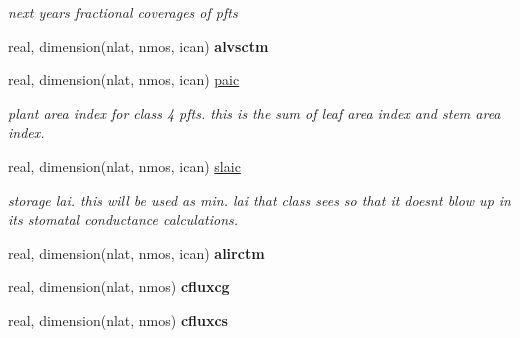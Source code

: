 \begin{DoxyCompactItemize}
\begin{DoxyCompactList}\small\item\em next year\textquotesingle{}s fractional coverages of pfts \end{DoxyCompactList}\item 
\hypertarget{structctem__statevars_1_1veg__rot_a3620434a43dd413dadbc2df0ab4c1a0c}{}real, dimension(nlat, nmos, ican) {\bfseries alvsctm}\label{structctem__statevars_1_1veg__rot_a3620434a43dd413dadbc2df0ab4c1a0c}

\item 
\hypertarget{structctem__statevars_1_1veg__rot_ab8144fc5348967ab33132c88b7235069}{}real, dimension(nlat, nmos, ican) \hyperlink{structctem__statevars_1_1veg__rot_ab8144fc5348967ab33132c88b7235069}{paic}\label{structctem__statevars_1_1veg__rot_ab8144fc5348967ab33132c88b7235069}

\begin{DoxyCompactList}\small\item\em plant area index for class\textquotesingle{} 4 pfts. this is the sum of leaf area index and stem area index. \end{DoxyCompactList}\item 
\hypertarget{structctem__statevars_1_1veg__rot_a2d77c552f815b9a3794df8cd396cba03}{}real, dimension(nlat, nmos, ican) \hyperlink{structctem__statevars_1_1veg__rot_a2d77c552f815b9a3794df8cd396cba03}{slaic}\label{structctem__statevars_1_1veg__rot_a2d77c552f815b9a3794df8cd396cba03}

\begin{DoxyCompactList}\small\item\em storage lai. this will be used as min. lai that class sees so that it doesn\textquotesingle{}t blow up in its stomatal conductance calculations. \end{DoxyCompactList}\item 
\hypertarget{structctem__statevars_1_1veg__rot_a646c8951d904a9c16dae50515625fdc1}{}real, dimension(nlat, nmos, ican) {\bfseries alirctm}\label{structctem__statevars_1_1veg__rot_a646c8951d904a9c16dae50515625fdc1}

\item 
\hypertarget{structctem__statevars_1_1veg__rot_a4c01f2ab1fdf24fd8522b5a04f1cee5e}{}real, dimension(nlat, nmos) {\bfseries cfluxcg}\label{structctem__statevars_1_1veg__rot_a4c01f2ab1fdf24fd8522b5a04f1cee5e}

\item 
\hypertarget{structctem__statevars_1_1veg__rot_a9cc0042147ffb86affb6e4db19011e6f}{}real, dimension(nlat, nmos) {\bfseries cfluxcs}\label{structctem__statevars_1_1veg__rot_a9cc0042147ffb86affb6e4db19011e6f}


\end{DoxyCompactItemize}
